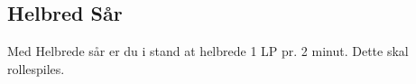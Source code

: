\subsection*{Helbred Sår}
Med Helbrede sår er du i stand at helbrede 1 LP pr. 2 minut. Dette skal rollespiles.